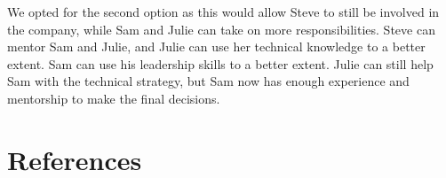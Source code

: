 \documentclass[a4paper,10pt]{article}
\begin{document}
We opted for the second option as this would allow Steve to still be involved in the company, while Sam and Julie can take on more responsibilities. Steve can mentor Sam and Julie, and Julie can use her technical knowledge to a better extent. Sam can use his leadership skills to a better extent. Julie can still help Sam with the technical strategy, but Sam now has enough experience and mentorship to make the final decisions.

\section{References}
\end{document}
